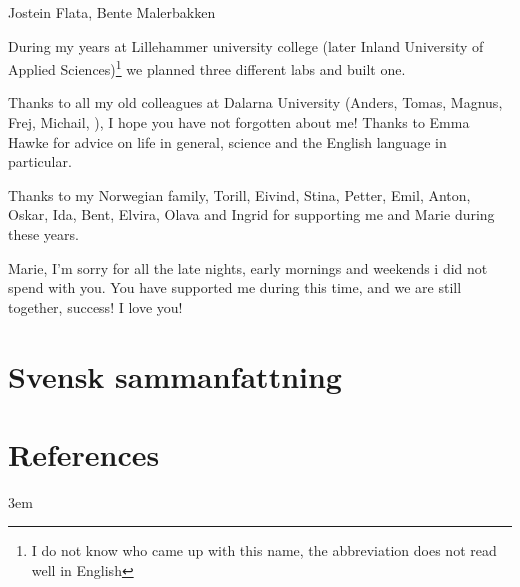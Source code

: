 \documentclass[twoside,10pt]{gihclass} %
\begin{document}
Jostein Flata, Bente Malerbakken

During my years at Lillehammer university college (later Inland University of Applied Sciences)\footnote{I do not know who came up with this name, the abbreviation does not read well in English} we planned three different labs and built one.

Thanks to all my old colleagues at Dalarna University (Anders, Tomas, Magnus, Frej, Michail, ), I hope you have not forgotten about me! Thanks to Emma Hawke for advice on life in general, science and the English language in particular.

Thanks to my Norwegian family, Torill, Eivind, Stina, Petter, Emil, Anton, Oskar, Ida, Bent, Elvira, Olava and Ingrid for supporting me and Marie during these years.

Marie, I'm sorry for all the late nights, early mornings and weekends i did not spend with you. You have supported me during this time, and we are still together, success! I love you!

\hypertarget{svensk-sammanfattning}{%
\chapter{Svensk sammanfattning}\label{svensk-sammanfattning}}

\backmatter

\hypertarget{references}{%
\chapter*{References}\label{references}}


\noindent

\setlength{\parskip}{4pt}

\rightskip3em

\footnotesize
\end{document}

